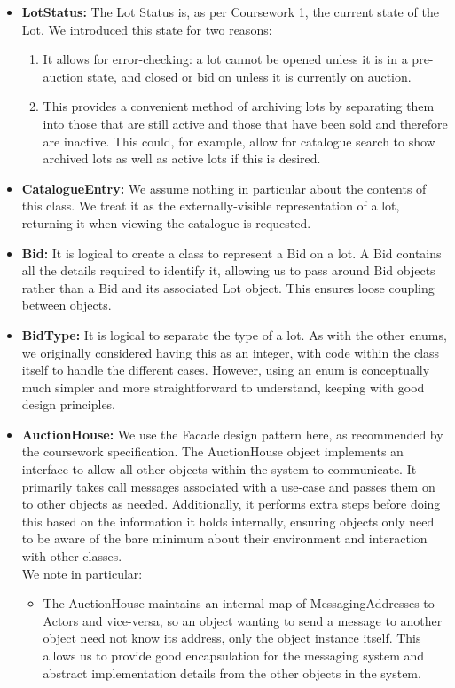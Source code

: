 \documentclass[titlepage, 12pt]{extarticle}
\begin{document}
\begin{itemize}
\item {\bf LotStatus: } The Lot Status is, as per Coursework 1, the current state of the Lot. We introduced this state for two reasons:
  \begin{enumerate}
    \item It allows for error-checking: a lot cannot be opened unless it is in a pre-auction state, and closed or bid on unless it is currently on auction.
    \item This provides a convenient method of archiving lots by separating them into those that are still active and those that have been sold and therefore are inactive. This could, for example, allow for catalogue search to show archived lots as well as active lots if this is desired.
  \end{enumerate}
\item {\bf CatalogueEntry: } We assume nothing in particular about the contents of this class. We treat it as the externally-visible representation of a lot, returning it when viewing the catalogue is requested. 
\item {\bf Bid: } It is logical to create a class to represent a Bid on a lot. A Bid contains all the details required to identify it, allowing us to pass around Bid objects rather than a Bid and its associated Lot object. This ensures loose coupling between objects.
\item {\bf BidType: } It is logical to separate the type of a lot. As with the other enums, we originally considered having this as an integer, with code within the class itself to handle the different cases. However, using an enum is conceptually much simpler and more straightforward to understand, keeping with good design principles.
\item {\bf AuctionHouse: } We use the Facade design pattern here, as recommended by the coursework specification. The AuctionHouse object implements an interface to allow all other objects within the system to communicate. It primarily takes call messages associated with a use-case and passes them on to other objects as needed. Additionally, it performs extra steps before doing this based on the information it holds internally, ensuring objects only need to be aware of the bare minimum about their environment and interaction with other classes.
  \\ We note in particular:
  \begin{itemize}
    \item The AuctionHouse maintains an internal map of MessagingAddresses to Actors and vice-versa, so an object wanting to send a message to another object need not know its address, only the object instance itself. This allows us to provide good encapsulation for the messaging system and abstract implementation details from the other objects in the system.

\end{itemize}
\end{itemize}
\end{document}
